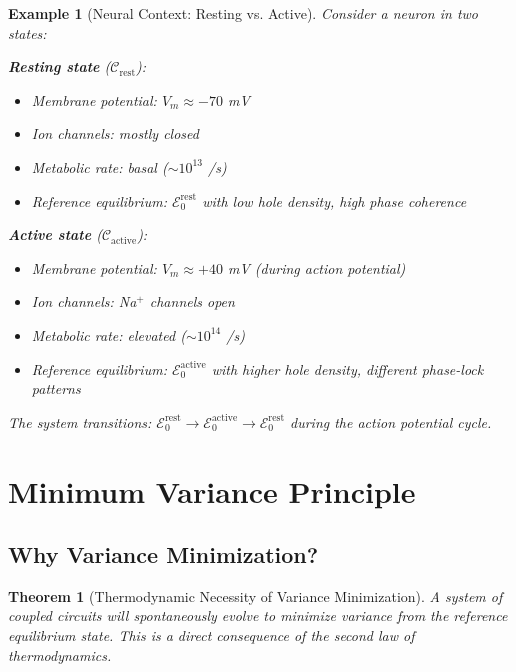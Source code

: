 \documentclass[12pt,a4paper]{article}
\newtheorem{theorem}{Theorem}
\newtheorem{example}{Example}
\begin{document}
\begin{example}[Neural Context: Resting vs. Active]
Consider a neuron in two states:

\textbf{Resting state} ($\mathcal{C}_{\text{rest}}$):
\begin{itemize}
\item Membrane potential: $V_m \approx -70$ mV
\item Ion channels: mostly closed
\item Metabolic rate: basal ($\sim 10^{13}$ /s)
\item Reference equilibrium: $\mathcal{E}_0^{\text{rest}}$ with low hole density, high phase coherence
\end{itemize}

\textbf{Active state} ($\mathcal{C}_{\text{active}}$):
\begin{itemize}
\item Membrane potential: $V_m \approx +40$ mV (during action potential)
\item Ion channels: Na$^+$ channels open
\item Metabolic rate: elevated ($\sim 10^{14}$ /s)
\item Reference equilibrium: $\mathcal{E}_0^{\text{active}}$ with higher hole density, different phase-lock patterns
\end{itemize}

The system transitions: $\mathcal{E}_0^{\text{rest}} \to \mathcal{E}_0^{\text{active}} \to \mathcal{E}_0^{\text{rest}}$ during the action potential cycle.
\end{example}

\section{Minimum Variance Principle}

\subsection{Why Variance Minimization?}

\begin{theorem}[Thermodynamic Necessity of Variance Minimization]
\label{thm:variance_necessity}
A system of coupled circuits will spontaneously evolve to minimize variance from the reference equilibrium state. This is a direct consequence of the second law of thermodynamics.
\end{theorem}
\end{document}

